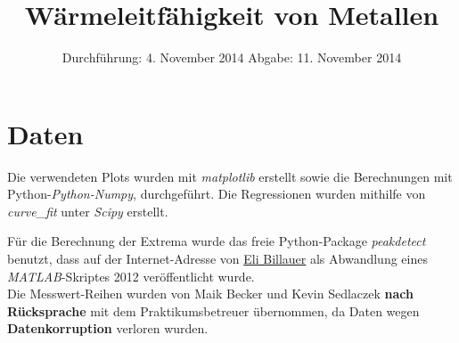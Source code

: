 
\usepackage{longtable}

\subject{Versuch 204}
\title{Wärmeleitfähigkeit von Metallen}

\date{
  Durchführung: 4. November 2014
  \hspace{1em}
  Abgabe: 11. November 2014
}


\maketitle
\thispagestyle{empty}
\newpage





\section{Daten}
%
%
%


\printbibliography
\noindent Die verwendeten Plots wurden mit \textit{matplotlib}\cite{matplotlib} erstellt sowie die Berechnungen mit Python-\textit{Python-Numpy}, \cite{numpy} durchgeführt.
Die Regressionen wurden mithilfe von \textit{curve\_fit} unter \textit{Scipy}\cite{scipy} erstellt.

Für die Berechnung der Extrema wurde das freie Python-Package \textit{peakdetect} benutzt, dass auf der Internet-Adresse von \href{http://billauer.co.il/peakdet.html}{Eli Billauer} als Abwandlung eines \textit{MATLAB}-Skriptes 2012 veröffentlicht wurde.\\

\noindent Die Messwert-Reihen wurden von Maik Becker und Kevin Sedlaczek \textbf{nach Rücksprache} mit dem Praktikumsbetreuer übernommen, da Daten wegen \textbf{Datenkorruption} verloren wurden.




